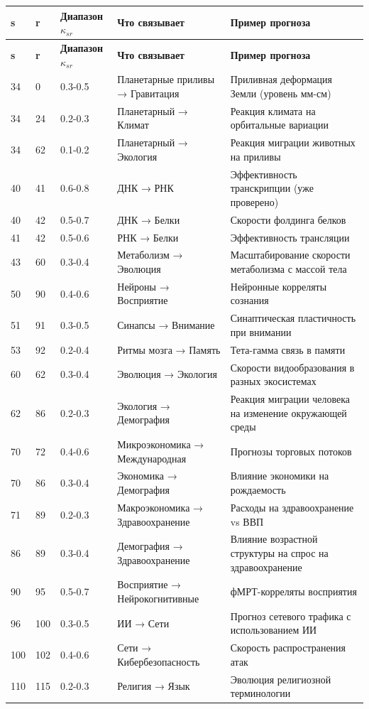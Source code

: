 \documentclass[11pt,a4paper]{article}
\begin{document}
	\begin{longtable}{|p{1cm}|p{1cm}|p{2.5cm}|p{4cm}|p{3cm}|}
		\hline
		\textbf{s} & \textbf{r} & \textbf{Диапазон $\kappa_{sr}$} & \textbf{Что связывает} & \textbf{Пример прогноза} \\
		\hline
		\endfirsthead
		\hline
		\textbf{s} & \textbf{r} & \textbf{Диапазон $\kappa_{sr}$} & \textbf{Что связывает} & \textbf{Пример прогноза} \\
		\hline
		\endhead
		34 & 0 & 0.3-0.5 & Планетарные приливы → Гравитация & Приливная деформация Земли (уровень мм-см) \\
		34 & 24 & 0.2-0.3 & Планетарный → Климат & Реакция климата на орбитальные вариации \\
		34 & 62 & 0.1-0.2 & Планетарный → Экология & Реакция миграции животных на приливы \\
		40 & 41 & 0.6-0.8 & ДНК → РНК & Эффективность транскрипции (уже проверено) \\
		40 & 42 & 0.5-0.7 & ДНК → Белки & Скорости фолдинга белков \\
		41 & 42 & 0.5-0.6 & РНК → Белки & Эффективность трансляции \\
		43 & 60 & 0.3-0.4 & Метаболизм → Эволюция & Масштабирование скорости метаболизма с массой тела \\
		50 & 90 & 0.4-0.6 & Нейроны → Восприятие & Нейронные корреляты сознания \\
		51 & 91 & 0.3-0.5 & Синапсы → Внимание & Синаптическая пластичность при внимании \\
		53 & 92 & 0.2-0.4 & Ритмы мозга → Память & Тета-гамма связь в памяти \\
		60 & 62 & 0.3-0.4 & Эволюция → Экология & Скорости видообразования в разных экосистемах \\
		62 & 86 & 0.2-0.3 & Экология → Демография & Реакция миграции человека на изменение окружающей среды \\
		70 & 72 & 0.4-0.6 & Микроэкономика → Международная & Прогнозы торговых потоков \\
		70 & 86 & 0.3-0.4 & Экономика → Демография & Влияние экономики на рождаемость \\
		71 & 89 & 0.2-0.3 & Макроэкономика → Здравоохранение & Расходы на здравоохранение vs ВВП \\
		86 & 89 & 0.3-0.4 & Демография → Здравоохранение & Влияние возрастной структуры на спрос на здравоохранение \\
		90 & 95 & 0.5-0.7 & Восприятие → Нейрокогнитивные & фМРТ-корреляты восприятия \\
		96 & 100 & 0.3-0.5 & ИИ → Сети & Прогноз сетевого трафика с использованием ИИ \\
		100 & 102 & 0.4-0.6 & Сети → Кибербезопасность & Скорость распространения атак \\
		110 & 115 & 0.2-0.3 & Религия → Язык & Эволюция религиозной терминологии \\
		\hline
	\end{longtable}
	
\end{document}
